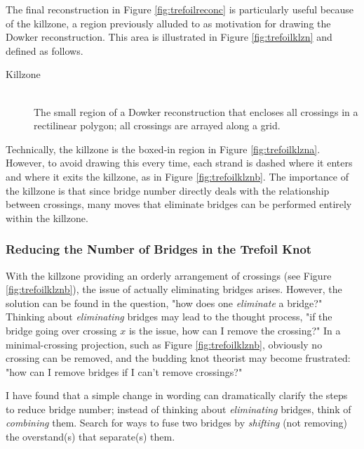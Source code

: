 \documentclass[titlepage,11pt]{article}
\begin{document}
The final reconstruction in Figure \ref{fig:trefoilreconc} is particularly useful because of the killzone, a region previously alluded to as motivation for drawing the Dowker reconstruction. This area is illustrated in Figure \ref{fig:trefoilklzn} and defined as follows.\par

\begin{defi}
    \begin{description}
        \item[Killzone] \hfill \\ The small region of a Dowker reconstruction that encloses all crossings in a rectilinear polygon; all crossings are arrayed along a grid.
    \end{description}
\end{defi}

Technically, the killzone is the boxed-in region in Figure \ref{fig:trefoilklzna}. However, to avoid drawing this every time, each strand is dashed where it enters and where it exits the killzone, as in Figure \ref{fig:trefoilklznb}. The importance of the killzone is that since bridge number directly deals with the relationship between crossings, many moves that eliminate bridges can be performed entirely within the killzone.


\subsubsection{Reducing the Number of Bridges in the Trefoil Knot}\label{ss2:trefoilreduce}
With the killzone providing an orderly arrangement of crossings (see Figure \ref{fig:trefoilklznb}), the issue of actually eliminating bridges arises. However, the solution can be found in the question, "how does one \emph{eliminate} a bridge?" Thinking about \emph{eliminating} bridges may lead to the thought process, "if the bridge going over crossing $x$ is the issue, how can I remove the crossing?" In a minimal-crossing projection, such as Figure \ref{fig:trefoilklznb}, obviously no crossing can be removed, and the budding knot theorist may become frustrated: "how can I remove bridges if I can't remove crossings?"\par
I have found that a simple change in wording can dramatically clarify the steps to reduce bridge number; instead of thinking about \emph{eliminating} bridges, think of \emph{combining} them. Search for ways to fuse two bridges by \emph{shifting} (not removing) the overstand(s) that separate(s) them.\par
\end{document}
